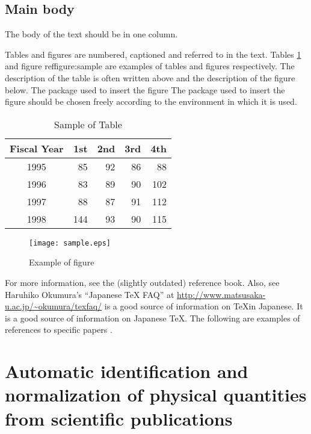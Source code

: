 \documentclass[12pt, a4paper]{report}
\begin{document}
\section{Main body}

The body of the text should be in one column.

Tables and figures are numbered, captioned and referred to in the
text. Tables \ref{table:fundamental_data_type} and figure
ref{figure:sample} are examples of tables and figures
respectively.
%
The description of the table is often written above and the
description of the figure below.
%
The package used to insert the figure The package used to insert the
figure should be chosen freely according to the environment in which
it is used.

\begin{table}[hbt]
\caption{Sample of Table}
\label{table:fundamental_data_type}
\begin{center}
\begin{tabular}{| c | r | r | r | r |}
\hline
Fiscal Year & 1st & 2nd & 3rd & 4th \\
\hline
1995 & 85 & 92 & 86 & 88 \\
1996 & 83 & 89 & 90 & 102 \\
1997 & 88 & 87 & 91 & 112 \\
1998 & 144 & 93 & 90 & 115 \\
\hline 
\end{tabular}
\end{center}
\end{table}
\medskip

\begin{figure}[htbp]
\begin{center}
\texttt{[image: sample.eps]}
\end{center}
\caption{Example of figure}
\label{figure:sample}
\end{figure}

For more information, see the (slightly outdated)
\cite{rakuraku,jiyu-jizai} reference book. Also, see Haruhiko
Okumura's ``Japanese TeX FAQ'' at 
\url{http://www.matsusaka-u.ac.jp/~okumura/texfaq/} is a good source of
information on \TeX in Japanese. It is a good source of information on
Japanese TeX. The following are examples of references to specific
papers \cite{bryant-ieeetc86}.

\chapter{Automatic identification and normalization of physical quantities from scientific publications}
\end{document}
